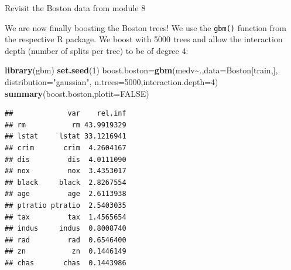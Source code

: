 \documentclass[
  10pt,
  ignorenonframetext,
]{beamer}
\newenvironment{Shaded}{\begin{snugshade}}{\end{snugshade}}
\newcommand{\AttributeTok}[1]{\textcolor[rgb]{0.13,0.29,0.53}{#1}}
\newcommand{\ConstantTok}[1]{\textcolor[rgb]{0.56,0.35,0.01}{#1}}
\newcommand{\DecValTok}[1]{\textcolor[rgb]{0.00,0.00,0.81}{#1}}
\newcommand{\FunctionTok}[1]{\textcolor[rgb]{0.13,0.29,0.53}{\textbf{#1}}}
\newcommand{\NormalTok}[1]{#1}
\newcommand{\OtherTok}[1]{\textcolor[rgb]{0.56,0.35,0.01}{#1}}
\newcommand{\SpecialCharTok}[1]{\textcolor[rgb]{0.81,0.36,0.00}{\textbf{#1}}}
\newcommand{\StringTok}[1]{\textcolor[rgb]{0.31,0.60,0.02}{#1}}
\begin{document}
\begin{frame}[fragile]
\begin{block}{Revisit the Boston data from module 8}
\protect\hypertarget{revisit-the-boston-data-from-module-8}{}
\(~\)

We are now finally boosting the Boston trees! We use the \texttt{gbm()}
function from the respective R package. We boost with 5000 trees and
allow the interaction depth (number of splits per tree) to be of degree
4:

\vspace{2mm}

\scriptsize

\begin{Shaded}
\begin{Highlighting}[]
\FunctionTok{library}\NormalTok{(gbm)}
\FunctionTok{set.seed}\NormalTok{(}\DecValTok{1}\NormalTok{)}
\NormalTok{boost.boston}\OtherTok{=}\FunctionTok{gbm}\NormalTok{(medv}\SpecialCharTok{\textasciitilde{}}\NormalTok{.,}\AttributeTok{data=}\NormalTok{Boston[train,],}
                 \AttributeTok{distribution=}\StringTok{"gaussian"}\NormalTok{,}
                 \AttributeTok{n.trees=}\DecValTok{5000}\NormalTok{,}\AttributeTok{interaction.depth=}\DecValTok{4}\NormalTok{)}
\FunctionTok{summary}\NormalTok{(boost.boston,}\AttributeTok{plotit=}\ConstantTok{FALSE}\NormalTok{)}
\end{Highlighting}
\end{Shaded}

\begin{verbatim}
##             var    rel.inf
## rm           rm 43.9919329
## lstat     lstat 33.1216941
## crim       crim  4.2604167
## dis         dis  4.0111090
## nox         nox  3.4353017
## black     black  2.8267554
## age         age  2.6113938
## ptratio ptratio  2.5403035
## tax         tax  1.4565654
## indus     indus  0.8008740
## rad         rad  0.6546400
## zn           zn  0.1446149
## chas       chas  0.1443986
\end{verbatim}
\end{block}
\end{frame}
\end{document}
